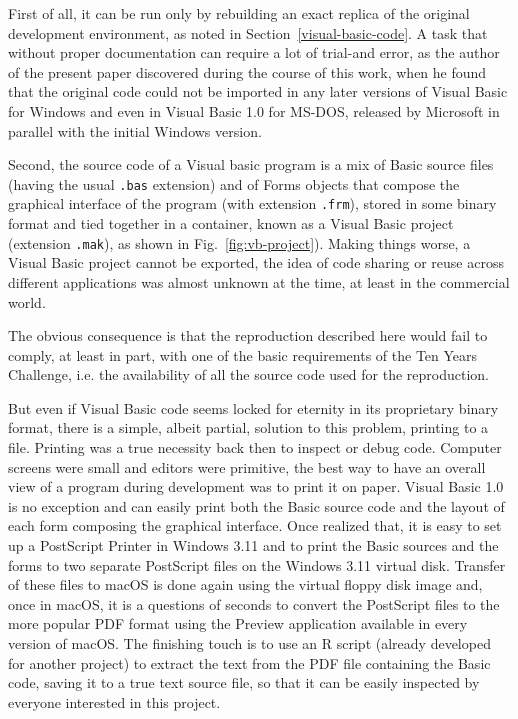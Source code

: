 First of all, it can be run only by rebuilding an exact replica of the original development environment, as noted in Section~\ref{visual-basic-code}. A task that without proper documentation can require a lot of trial-and error, as the author of the present paper discovered during the course of this work, when he found that the original code could not be imported in any later versions of Visual Basic for Windows and even in Visual Basic 1.0 for MS-DOS, released by Microsoft in parallel with the initial Windows version.

Second, the source code of a Visual basic program is a mix of Basic source files (having the usual \texttt{.bas} extension) and of Forms objects that compose the graphical interface of the program (with extension \texttt{.frm}), stored in some binary format and tied together in a container, known as a Visual Basic project (extension \texttt{.mak}), as shown in Fig.~\ref{fig:vb-project}).
Making things worse, a Visual Basic project cannot be exported, the idea of code sharing or reuse across different applications was almost unknown at the time, at least in the commercial world.

The obvious consequence is that the reproduction described here would fail to comply, at least in part, with one of the basic requirements of the Ten Years Challenge, i.e. the availability of all the source code used for the reproduction.

But even if Visual Basic code seems locked for eternity in its proprietary binary format, there is a simple, albeit partial, solution to this problem, printing to a file. 
Printing was a true necessity back then to inspect or debug code. Computer screens were small and editors were primitive, the best way to have an overall view of a program during development was to print it on paper. Visual Basic 1.0 is no exception and can easily print both the Basic source code and the layout of each form composing the graphical interface. 
Once realized that, it is easy to set up a PostScript Printer in Windows 3.11 and to print the Basic sources and the forms to two separate PostScript files on the Windows 3.11 virtual disk. 
Transfer of these files to macOS is done again using the virtual floppy disk image and, once in macOS, it is a questions of seconds to convert the PostScript files to the more popular PDF format using the Preview application available in every version of macOS. 
The finishing touch is to use an R script (already developed for another project) to extract the text from the PDF file containing the Basic code, saving it to a true text source file, so that it can be easily inspected by everyone interested in this project.



